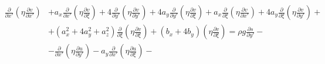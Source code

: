\begin{equation*}
    \begin{split}
        \frac
            {\partial }
            {\partial x'}
        \left(
            \eta
            \frac
                {\partial v}
                {\partial x'}
        \right)
        &
        +
        a_x
        \frac
            {\partial }
            {\partial x'}
        \left(
            \eta
            \frac
                {\partial v}
                {\partial \xi}
        \right)
        +
        4
        \frac
            {\partial }
            {\partial y'}
        \left(
            \eta
            \frac
                {\partial v}
                {\partial y'}
        \right)
        +
        4
        a_y
        \frac
            {\partial }
            {\partial y'}
        \left(
            \eta
            \frac
                {\partial v}
                {\partial \xi}
        \right)
        +
        a_x
        \frac
            {\partial }
            {\partial \xi}
        \left(
            \eta
            \frac
                {\partial v}
                {\partial x'}
        \right)
        +
        4
        a_y
        \frac
            {\partial }
            {\partial \xi}
        \left(
            \eta
            \frac
                {\partial v}
                {\partial y'}
        \right)
        +
        \\
        &
        +
        \left(
            a^2_x
            +
            4
            a^2_y
            +
            a^2_z
        \right)
        \frac
            {\partial }
            {\partial \xi}
        \left(
            \eta
            \frac
                {\partial v}
                {\partial \xi}
        \right)
        +
        \left(
            b_x
            +
            4
            b_y
        \right)
        \left(
            \eta
            \frac
                {\partial v}
                {\partial \xi}
        \right)
        =
        \rho
        g
        \frac
            {\partial s}
            {\partial y'}
        -
        \\
        &
        -
        \frac
            {\partial }
            {\partial x'}
        \left(
            \eta
            \frac
                {\partial u}
                {\partial y'}
        \right)
        -
        a_y
        \frac
            {\partial }
            {\partial x'}
        \left(
            \eta
            \frac
                {\partial u}
                {\partial \xi}
        \right)
        -

\end{split}
\end{equation*}
